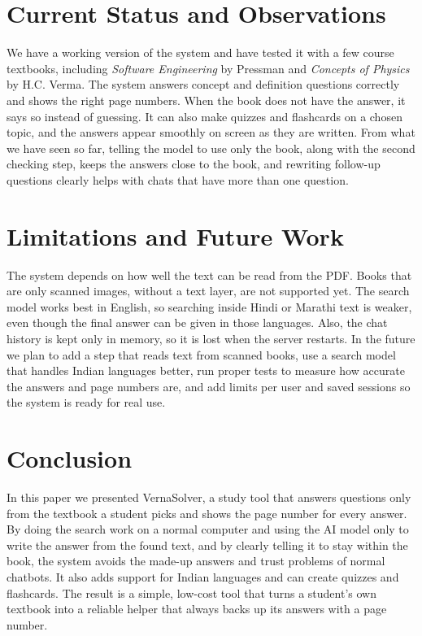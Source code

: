\documentclass[conference]{IEEEtran}
\begin{document}
\section{Current Status and Observations}
We have a working version of the system and have tested it with a few
course textbooks, including \textit{Software Engineering} by Pressman and
\textit{Concepts of Physics} by H.C. Verma. The system answers concept
and definition questions correctly and shows the right page numbers. When
the book does not have the answer, it says so instead of guessing. It can
also make quizzes and flashcards on a chosen topic, and the answers
appear smoothly on screen as they are written. From what we have seen so
far, telling the model to use only the book, along with the second
checking step, keeps the answers close to the book, and rewriting
follow-up questions clearly helps with chats that have more than one
question.

\section{Limitations and Future Work}
The system depends on how well the text can be read from the PDF. Books
that are only scanned images, without a text layer, are not supported
yet. The search model works best in English, so searching inside Hindi or
Marathi text is weaker, even though the final answer can be given in those
languages. Also, the chat history is kept only in memory, so it is lost
when the server restarts. In the future we plan to add a step that reads
text from scanned books, use a search model that handles Indian languages
better, run proper tests to measure how accurate the answers and page
numbers are, and add limits per user and saved sessions so the system is
ready for real use.

\section{Conclusion}
In this paper we presented VernaSolver, a study tool that answers
questions only from the textbook a student picks and shows the page
number for every answer. By doing the search work on a normal computer
and using the AI model only to write the answer from the found text, and
by clearly telling it to stay within the book, the system avoids the
made-up answers and trust problems of normal chatbots. It also adds
support for Indian languages and can create quizzes and flashcards. The
result is a simple, low-cost tool that turns a student's own textbook
into a reliable helper that always backs up its answers with a page
number.
\end{document}

